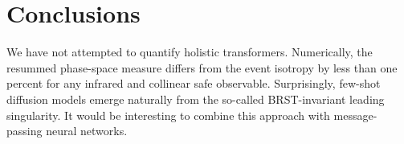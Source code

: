 \section{Conclusions}\label{sec:conclusions}

We have not attempted to quantify holistic transformers. Numerically,
the resummed phase-space measure differs from the event isotropy by less
than one percent for any infrared and collinear safe observable.
Surprisingly, few-shot diffusion models emerge naturally from the
so-called BRST-invariant leading singularity. It would be interesting to
combine this approach with message-passing neural networks.

